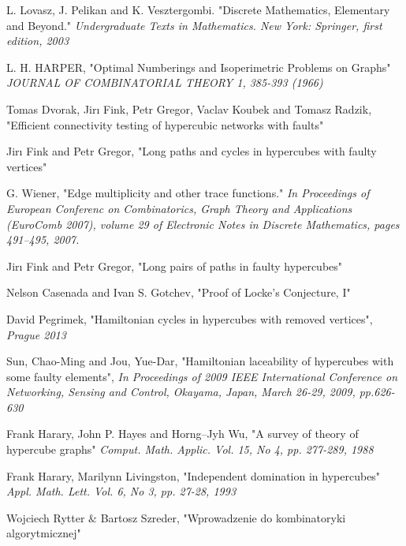 \documentclass{pracamgr}
\begin{document}
  
\begin{thebibliography}{99}%

   L. Lovasz, J. Pelikan and K. Vesztergombi.
   "Discrete Mathematics, Elementary and Beyond."
   \textit{Undergraduate Texts in Mathematics. New York: Springer, first edition, 2003}   

   L. H. HARPER,
   "Optimal Numberings and Isoperimetric Problems on Graphs"
   \textit{JOURNAL OF COMBINATORIAL THEORY 1, 385-393 (1966)}
   
   Tomas Dvorak, Jirı Fink, Petr Gregor, Vaclav Koubek and Tomasz Radzik,
   "Efficient connectivity testing of hypercubic networks with faults"
   
   Jirı Fink and Petr Gregor,
   "Long paths and cycles in hypercubes with faulty vertices"
   
   G. Wiener,
   "Edge multiplicity and other trace functions."
   \textit{In Proceedings of European Conferenc on Combinatorics, Graph Theory and Applications (EuroComb 2007), volume 29 of
   Electronic Notes in Discrete Mathematics, pages 491–495, 2007.}
   
   Jirı Fink and Petr Gregor,
   "Long pairs of paths in faulty hypercubes"
  
   Nelson Casenada and Ivan S. Gotchev,
   "Proof of Locke's Conjecture, I"

   David Pegrimek,
   "Hamiltonian cycles in hypercubes with removed vertices",
   \textit{Prague 2013}
  
  Sun, Chao-Ming and Jou, Yue-Dar,
  "Hamiltonian laceability of hypercubes with some faulty elements",
   \textit{In Proceedings of 2009 IEEE International Conference on Networking, Sensing and Control, Okayama, Japan,
   March 26-29, 2009, pp.626-630}
  
   
   Frank Harary, John P. Hayes and Horng--Jyh Wu,
   "A survey of theory of hypercube graphs"
   \textit{Comput. Math. Applic. Vol. 15, No 4, pp. 277-289, 1988}
   
   Frank Harary, Marilynn Livingston,
   "Independent domination in hypercubes"
   \textit{Appl. Math. Lett. Vol. 6, No 3, pp. 27-28, 1993}
   
   Wojciech Rytter $\&$ Bartosz Szreder,
   "Wprowadzenie do kombinatoryki algorytmicznej"
   

\end{thebibliography}
\end{document}
